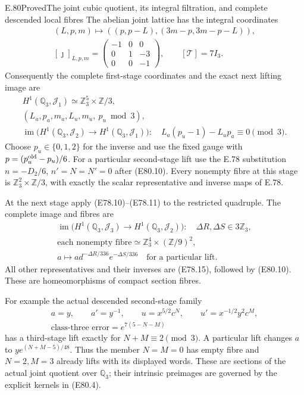 \begin{statement}{E.80}{Proved}{The joint cubic quotient, its integral filtration, and complete descended local fibres}
The abelian joint lattice has the integral coordinates
\[
 \begin{gathered}
 (L,p,m)\longmapsto
       ((p,p-L),(3m-p,3m-p-L)),\\
 [\jmath]_{L,p,m}=
 \begin{pmatrix}-1&0&0\\0&1&-3\\0&0&-1\end{pmatrix},
       \qquad [\mathcal T]=7I_3.
 \end{gathered}
 \tag{E80.11}
\]
Consequently the complete first-stage coordinates and
the exact next lifting image are
\[
 \begin{gathered}
 H^1(\mathbb Q_3,\mathcal J_1)\simeq
           \mathbb Z_3^5\times\mathbb Z/3,\\
 (L_a,p_a,m_a,L_u,m_u,\ p_u\bmod3),\\
 \operatorname{im}\bigl(H^1(\mathbb Q_3,\mathcal J_2)
                  \to H^1(\mathbb Q_3,\mathcal J_1)\bigr):
       \quad L_a(p_u-1)-L_up_a\equiv0\pmod3.
 \end{gathered}
 \tag{E80.12}
\]
Choose $p_u\in\{0,1,2\}$ for the inverse and use
the fixed gauge with $p=(p_u^{\rm old}-p_u)/6$.
For a particular second-stage lift use the E.78
substitution $n=-D_2/6$, $n'=N=N'=0$ after (E80.10).
Every nonempty fibre at this stage is
$\mathbb Z_3^2\times\mathbb Z/3$, with exactly the
scalar representative and inverse maps of E.78.

At the next stage apply (E78.10)--(E78.11) to the
restricted quadruple. The complete image and fibres
are
\[
 \begin{gathered}
 \operatorname{im}\bigl(H^1(\mathbb Q_3,\mathcal J_3)
                 \to H^1(\mathbb Q_3,\mathcal J_2)\bigr):
       \quad\Delta R,\Delta S\in3\mathbb Z_3,\\
 \text{each nonempty fibre}\simeq
               \mathbb Z_3^4\times(\mathbb Z/9)^2,\\
 a\longmapsto a d^{-\Delta R/336}e^{-\Delta S/336}
                  \quad\text{for a particular lift}.
 \end{gathered}
 \tag{E80.13}
\]
All other representatives and their inverses are
(E78.15), followed by (E80.10). These are
homeomorphisms of compact section fibres.

For example the actual descended second-stage family
\[
 \begin{gathered}
 a=y,\qquad a'=y^{-1},\qquad
 u=x^{5/2}c^N,\qquad u'=x^{-1/2}y^2c^M,\\
 \text{class-three error}=e^{7(5-N-M)}
 \end{gathered}
 \tag{E80.14}
\]
has a third-stage lift exactly for $N+M\equiv2\pmod3$.
A particular lift changes $a$ to
$y e^{(N+M-5)/48}$. Thus the member $N=M=0$ has
empty fibre and $N=2,M=3$ already lifts with its
displayed words. These are sections of the actual
joint quotient over $\mathbb Q_3$; their intrinsic
preimages are governed by the explicit kernels in
(E80.4).


\end{statement}
